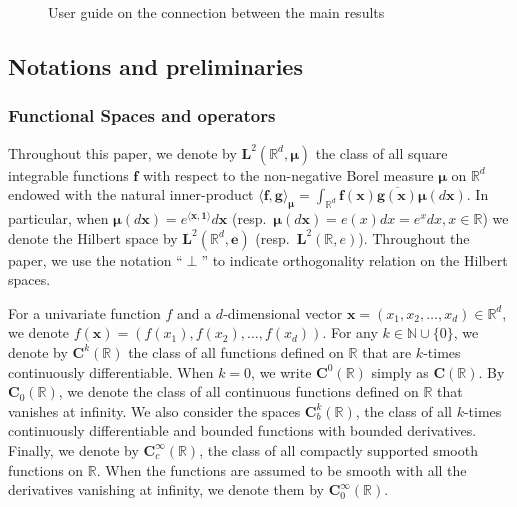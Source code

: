 \documentclass[12pt]{amsart}
\numberwithin{equation}{section}
\newcommand{\bb}{\mathbb}
\newcommand{\bmrm}[2][2]{\mathbf{#2}^{#1}}
\newcommand{\C}{\mathbf{C}}
\newcommand{\NN}{\mathbf{N}}
\newcommand{\f}{\mathbf{f}}
\newcommand{\g}{\mathbf{g}}
\theoremstyle{definition}
\theoremstyle{assump}
\theoremstyle{remark}
\begin{document}
\begin{figure}[ht]
	\caption{User guide on the connection between the main results}\label{fig:organization}
\end{figure}


\subsection{Notations and preliminaries}
\subsubsection{Functional Spaces and operators}  Throughout this paper, we denote by $\bmrm{L}(\bb{R}^d,\bm{\mu})$ the class of all square integrable functions $\f$ with respect to the non-negative Borel measure $\bm{\mu}$ on $\bb{R}^d$ endowed with the natural inner-product $\langle \f,\g\rangle_{\bm{\mu}}=\int_{\bb{R}^d} \f(\bm{x})\overline{\g(\bm{x})}\bm{\mu}(d\bm{x})$. In particular, when $\bm{\mu}(d\bm{x})=e^{\langle \bm{x},\bm{1}\rangle}d\bm{x}$ (resp.~$\bm{\mu}(d\bm x)=e(x)dx=e^x dx, x \in \bb{R}$) we denote the Hilbert space by $\bmrm{L}(\bb{R}^d,\mathbf{e})$ (resp.~$\bmrm{L}(\bb{R},e)$). Throughout the paper, we use the notation ``$\perp$'' to indicate orthogonality relation on the Hilbert spaces.

For a univariate function $f$ and a $d$-dimensional vector $\bm{x}=(x_1,x_2,\ldots, x_d)\in\bb R^d$, we denote $f(\bm{x})=(f(x_1),f(x_2),\ldots, f(x_d))$. For any $k\in\bb{N}\cup \{0\}$, we denote by $\C^k(\bb{R})$ the class of all functions defined on $\bb{R}$ that are $k$-times continuously differentiable. When $k=0$, we write $\C^0(\bb{R})$ simply as $\C(\bb{R})$. By $\C_0(\bb{R})$, we denote the class of all continuous functions defined on $\bb{R}$ that vanishes at infinity. We also consider the spaces $\C^k_b(\bb{R})$, the class of all $k$-times continuously differentiable and bounded functions with bounded derivatives. Finally, we denote by $\C^\infty_c(\bb{R})$, the class of all compactly supported smooth functions on $\bb{R}$.  When the functions are assumed to be smooth with all the derivatives vanishing at infinity, we denote them by $\C^\infty_0(\bb{R})$.
\end{document}
